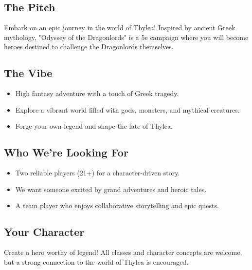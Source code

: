 \documentclass[a4paper, 8pt]{extarticle}
\begin{document}
\color{OODL_Blue}


\vspace{2cm}

\subsection*{\textbf{The Pitch}}
\vspace{-1mm}
Embark on an epic journey in the world of Thylea! Inspired by ancient Greek mythology, "Odyssey of the Dragonlords" is a 5e campaign where you will become heroes destined to challenge the Dragonlords themselves.

\vspace{-1mm}
\subsection*{\textbf{The Vibe}}
\begin{itemize}[itemsep=-1mm]
    \item High fantasy adventure with a touch of Greek tragedy.
    \item Explore a vibrant world filled with gods, monsters, and mythical creatures.
    \item Forge your own legend and shape the fate of Thylea.
\end{itemize}

\vspace{-1mm}
\subsection*{\textbf{Who We're Looking For}}
\begin{itemize}[itemsep=-1mm]
    \item Two reliable players (21+) for a character-driven story.
    \item We want someone excited by grand adventures and heroic tales.
    \item A team player who enjoys collaborative storytelling and epic quests.
\end{itemize}

\vspace{-1mm}
\subsection*{\textbf{Your Character}}
\vspace{-1mm}
Create a hero worthy of legend! All classes and character concepts are welcome, but a strong connection to the world of Thylea is encouraged.
\end{document}
